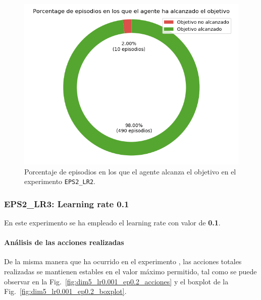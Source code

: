 \begin{figure}
    \centering
    \includegraphics[scale=0.4]{cap5_experimentacion/images/dim5_lr0.01_ep0.2_porcentajeResuelto.png}
    \caption{Porcentaje de episodios en los que el agente alcanza el objetivo en el experimento \texttt{EPS2\_LR2}.}
    \label{fig:dim5_lr0.01_ep0.2_porcentajeResuelto}
\end{figure}

\subsubsection{EPS2\_LR3: Learning rate 0.1} \label{EPS2_LR3}

En este experimento se ha empleado el learning rate con valor de \textbf{0.1}. \\

\paragraph{Análisis de las acciones realizadas}

De la misma manera que ha ocurrido en el experimento , las acciones totales realizadas se mantienen estables en el valor máximo permitido, tal como se puede observar en la Fig.~\ref{fig:dim5_lr0.001_ep0.2_acciones} y el boxplot de la Fig.~\ref{fig:dim5_lr0.001_ep0.2_boxplot}. \\

